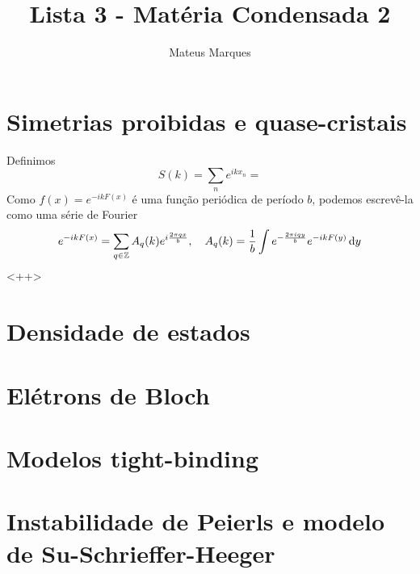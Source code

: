 \documentclass[a4paper,10pt]{article}
\title{\Huge{\textbf{Lista 3 - Matéria Condensada 2}}}
\author{Mateus Marques}
\begin{document}
\maketitle

\section{Simetrias proibidas e quase-cristais}

Definimos
$$
S(k) = \sum_{n} e^{i k x_n} =
$$
Como $f(x) = e^{-i k F(x)}$ é uma função periódica de período $b$, podemos escrevê-la como uma série de Fourier
$$
e^{-i k F(x)} = \sum_{q \in \mathbb{Z}} A_q(k) e^{i \frac{2\pi q x}{b}}, \quad
A_q(k) = \frac{1}{b} \int e^{-\frac{2\pi i q y}{b}} e^{-i k F(y)} \dd{y}
$$
<++>

\pagebreak

\section{Densidade de estados}

\pagebreak

\section{Elétrons de Bloch}

\pagebreak

\section{Modelos tight-binding}

\pagebreak

\section{Instabilidade de Peierls e modelo de Su-Schrieffer-Heeger}
\end{document}
